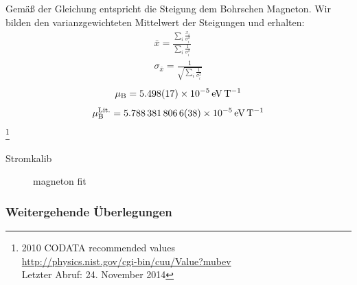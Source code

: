 \documentclass[11pt, a4paper]{article}
\begin{document}
Gemäß der Gleichung entspricht die Steigung dem Bohrschen Magneton. Wir bilden den varianzgewichteten Mittelwert der Steigungen und erhalten:
\begin{align}
	\bar{x} = \frac{\sum_i \frac{x_i}{\sigma_i^2}}{\sum_i \frac{1}{\sigma_i^2}} \\
	\sigma_{\bar{x}} = \frac{1}{\sqrt{\sum_i \frac{1}{\sigma_i^2}}}
\end{align}
\begin{align}
	\mu_\mathrm{B} = \SI{5.498 +- 0.017e-5}{\electronvolt\per\tesla}
\end{align}
\begin{align}
	\mu_\mathrm{B}^{\mathrm{Lit.}} = \SI{5.7883818066 +- 0.0000000038e-5}{\electronvolt\per\tesla}
\end{align}
\footnote{2010 CODATA recommended values\\ \url{http://physics.nist.gov/cgi-bin/cuu/Value?mubev}\\ Letzter Abruf: 24. November 2014}


\begin{table}[h]
	\centering
	
	\caption{Stromkalib}
	\label{tab:mittelwert_kalibration}
\end{table}


\begin{figure}[h]
	\centering
	
	\caption{magneton fit}
	\label{fig:magneton_fit}
\end{figure}


\subsubsection{Weitergehende Überlegungen}
\end{document}
